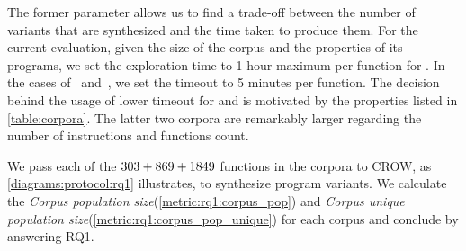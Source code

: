 The former parameter allows us to find a trade-off between the number of variants that are synthesized and the time taken to produce them. For the current evaluation, given the size of the corpus and the properties of its programs, we set the exploration time to 1 hour maximum per function for \corpusrosetta. In the cases of \corpussodium\ and\ \corpusqrcode, we set the timeout to 5 minutes per function. The decision behind the usage of lower timeout for \corpussodium
and \corpusqrcode is motivated by the properties listed in \autoref{table:corpora}. The latter two corpora are remarkably larger regarding the number of instructions and functions count. 

We pass each of the $303 + 869 + 1849$ functions in the corpora to CROW, as \autoref{diagrams:protocol:rq1} illustrates, to synthesize program variants. We calculate the \emph{Corpus population size}(\autoref{metric:rq1:corpus_pop}) and \emph{Corpus unique population size}(\autoref{metric:rq1:corpus_pop_unique}) for each corpus and conclude by answering RQ1.
